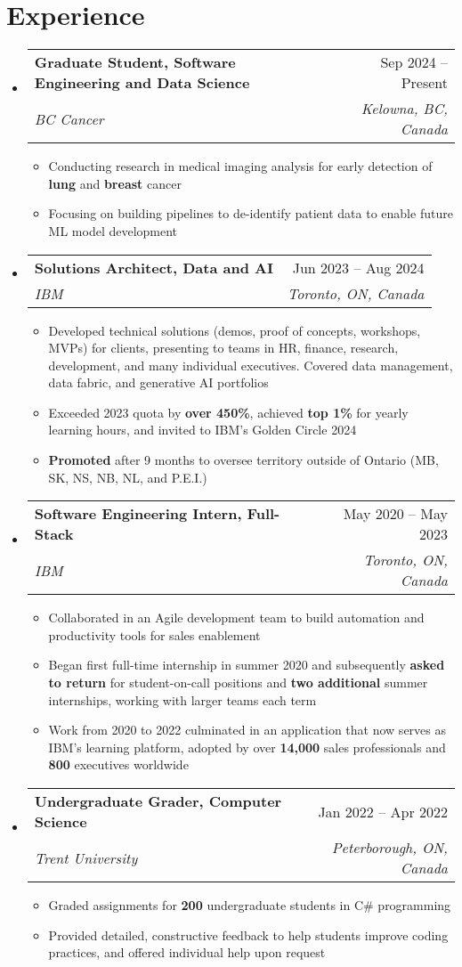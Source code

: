 \documentclass[letterpaper,11.5pt]{article}
\makeatletter
\newcommand{\resumeItem}[1]{
  \item\small{
    {#1 \vspace{-2pt}}
  }
}
\newcommand{\resumeSubheading}[4]{
  \vspace{-2pt}\item
    \begin{tabular*}{0.97\textwidth}[t]{l@{\extracolsep{\fill}}r}
      \textbf{#1} & #2 \\
      \textit{\small#3} & \textit{\small #4} \\
    \end{tabular*}\vspace{-7pt}
}
\newcommand{\resumeSubHeadingListStart}{\begin{itemize}[leftmargin=0.15in, label={}]}
\newcommand{\resumeSubHeadingListEnd}{\end{itemize}}
\newcommand{\resumeItemListStart}{\begin{itemize}}
\newcommand{\resumeItemListEnd}{\end{itemize}\vspace{-5pt}}
\makeatother
\begin{document}
\section{Experience}
  \resumeSubHeadingListStart
    \resumeSubheading
      {Graduate Student, Software Engineering and Data Science}{Sep 2024 -- Present}
      {BC Cancer}{Kelowna, BC, Canada}
      \resumeItemListStart
        \resumeItem{Conducting research in medical imaging analysis for early detection of \textbf{lung} and \textbf{breast} cancer}
        \resumeItem{Focusing on building pipelines to de-identify patient data to enable future ML model development}
      \resumeItemListEnd
    \resumeSubheading
      {Solutions Architect, Data and AI}{Jun 2023 -- Aug 2024}
      {IBM}{Toronto, ON, Canada}
      \resumeItemListStart
        \resumeItem{Developed technical solutions (demos, proof of concepts, workshops, MVPs) for clients, presenting to teams in HR, finance, research, development, and many individual executives. Covered data management, data fabric, and generative AI portfolios}
        \resumeItem{Exceeded 2023 quota by \textbf{over 450\%}, achieved \textbf{top 1\%} for yearly learning hours, and invited to IBM's Golden Circle 2024}
        \resumeItem{\textbf{Promoted} after 9 months to oversee territory outside of Ontario (MB, SK, NS, NB, NL, and P.E.I.)}
      \resumeItemListEnd
    \resumeSubheading
      {Software Engineering Intern, Full-Stack}{May 2020 -- May 2023}
      {IBM}{Toronto, ON, Canada}
      \resumeItemListStart
        \resumeItem{Collaborated in an Agile development team to build automation and productivity tools for sales enablement}
        \resumeItem{Began first full-time internship in summer 2020 and subsequently \textbf{asked to return} for student-on-call positions and \textbf{two additional} summer internships, working with larger teams each term}
        \resumeItem{Work from 2020 to 2022 culminated in an application that now serves as IBM's learning platform, adopted by over \textbf{14,000} sales professionals and \textbf{800} executives worldwide}
      \resumeItemListEnd
      \resumeSubheading
      {Undergraduate Grader, Computer Science}{Jan 2022 -- Apr 2022}
      {Trent University}{Peterborough, ON, Canada}
      \resumeItemListStart
        \resumeItem{Graded assignments for \textbf{200} undergraduate students in C\# programming}
        \resumeItem{Provided detailed, constructive feedback to help students improve coding practices, and offered individual help upon request}
      \resumeItemListEnd
  \resumeSubHeadingListEnd
\end{document}
